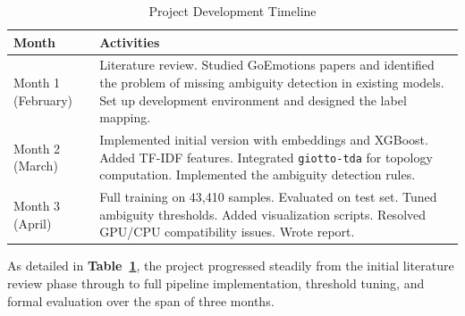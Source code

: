 \begin{table}[H]
\centering
\caption{Project Development Timeline}
\label{tab:timeline}
\begin{tabular}{lp{9cm}}
\toprule
\textbf{Month} & \textbf{Activities} \\
\midrule
Month 1 (February) &
Literature review. Studied GoEmotions papers and identified the problem of missing ambiguity
detection in existing models. Set up development environment and designed the label mapping. \\
\addlinespace
Month 2 (March) &
Implemented initial version with embeddings and XGBoost. Added TF-IDF features. Integrated
\texttt{giotto-tda} for topology computation. Implemented the ambiguity detection rules. \\
\addlinespace
Month 3 (April) &
Full training on 43,410 samples. Evaluated on test set. Tuned ambiguity thresholds.
Added visualization scripts. Resolved GPU/CPU compatibility issues. Wrote report. \\
\bottomrule
\end{tabular}
\end{table}

As detailed in \textbf{Table~\ref{tab:timeline}}, the project progressed steadily from the initial
literature review phase through to full pipeline implementation, threshold tuning, and formal
evaluation over the span of three months.
